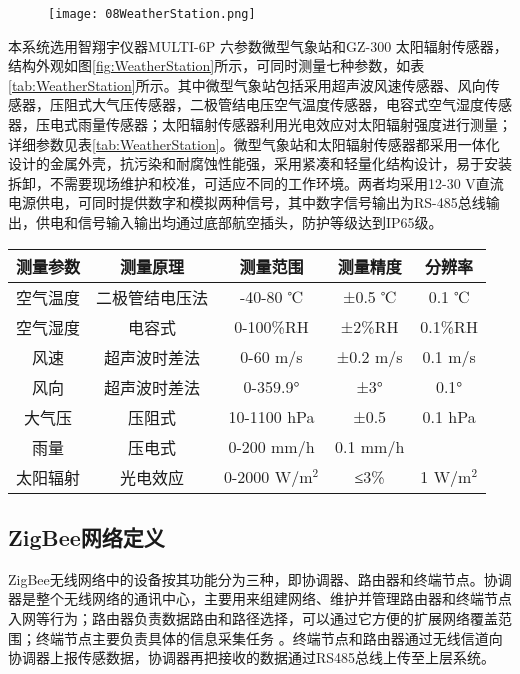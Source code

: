   		\begin{figure}[!htbp]
  			\centering
 			\texttt{[image: 08WeatherStation.png]}
		\end{figure}
		本系统选用智翔宇仪器MULTI-6P 六参数微型气象站和GZ-300 太阳辐射传感器，结构外观如图\ref{fig:WeatherStation}所示，可同时测量七种参数，如表\ref{tab:WeatherStation}所示\supercite{SunYuguang2009}。其中微型气象站包括采用超声波风速传感器、风向传感器，压阻式大气压传感器，二极管结电压空气温度传感器，电容式空气湿度传感器，压电式雨量传感器；太阳辐射传感器利用光电效应对太阳辐射强度进行测量；详细参数见表\ref{tab:WeatherStation}。微型气象站和太阳辐射传感器都采用一体化设计的金属外壳，抗污染和耐腐蚀性能强，采用紧凑和轻量化结构设计，易于安装拆卸，不需要现场维护和校准，可适应不同的工作环境。两者均采用12-30 V直流电源供电，可同时提供数字和模拟两种信号，其中数字信号输出为RS-485总线输出，供电和信号输入输出均通过底部航空插头，防护等级达到IP65级。
		
		\begin{table}[!htbp]
  			\centering
  			\begin{tabular}{ccccc} \toprule
			测量参数 & 测量原理 & 测量范围 & 测量精度 & 分辨率\\ \midrule
			空气温度 & 二极管结电压法 & -40-80 ℃ &	±0.5 ℃ &	0.1 ℃\\
			空气湿度 & 电容式 & 0-100\%RH & ±2\%RH & 0.1\%RH\\
			风速 & 超声波时差法 & 0-60 m/s & ±0.2 m/s & 0.1 m/s\\
			风向 & 超声波时差法 & 0-359.9° & ±3° & 0.1°\\
			大气压 & 压阻式 & 10-1100 hPa	 & ±0.5	 & 0.1 hPa\\
			雨量 & 压电式 & 0-200 mm/h	 & 	0.1 mm/h\\
			太阳辐射 & 光电效应 & 0-2000 W/$\text{m}^{2}$& ≤3\% & 	1 W/$\text{m}^{2}$\\ \bottomrule
 			\end{tabular}
		\end{table}

	\subsection{ZigBee网络定义}
	ZigBee无线网络中的设备按其功能分为三种，即协调器、路由器和终端节点。协调器是整个无线网络的通讯中心，主要用来组建网络、维护并管理路由器和终端节点入网等行为；路由器负责数据路由和路径选择，可以通过它方便的扩展网络覆盖范围；终端节点主要负责具体的信息采集任务\supercite{FuLingfeng2016} 。终端节点和路由器通过无线信道向协调器上报传感数据，协调器再把接收的数据通过RS485总线上传至上层系统。
	
